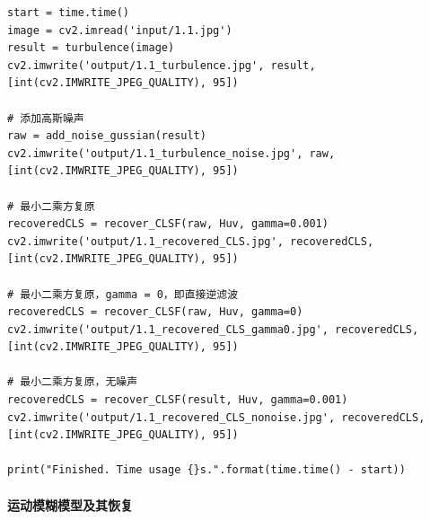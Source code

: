 \documentclass[11pt]{ctexart}
\begin{document}
\begin{lstlisting}
start = time.time()
image = cv2.imread('input/1.1.jpg')
result = turbulence(image)
cv2.imwrite('output/1.1_turbulence.jpg', result, [int(cv2.IMWRITE_JPEG_QUALITY), 95])

# 添加高斯噪声
raw = add_noise_gussian(result)
cv2.imwrite('output/1.1_turbulence_noise.jpg', raw, [int(cv2.IMWRITE_JPEG_QUALITY), 95])

# 最小二乘方复原
recoveredCLS = recover_CLSF(raw, Huv, gamma=0.001)
cv2.imwrite('output/1.1_recovered_CLS.jpg', recoveredCLS, [int(cv2.IMWRITE_JPEG_QUALITY), 95])

# 最小二乘方复原，gamma = 0，即直接逆滤波
recoveredCLS = recover_CLSF(raw, Huv, gamma=0)
cv2.imwrite('output/1.1_recovered_CLS_gamma0.jpg', recoveredCLS, [int(cv2.IMWRITE_JPEG_QUALITY), 95])

# 最小二乘方复原，无噪声
recoveredCLS = recover_CLSF(result, Huv, gamma=0.001)
cv2.imwrite('output/1.1_recovered_CLS_nonoise.jpg', recoveredCLS, [int(cv2.IMWRITE_JPEG_QUALITY), 95])

print("Finished. Time usage {}s.".format(time.time() - start))
\end{lstlisting}

\paragraph{运动模糊模型及其恢复}
\end{document}
